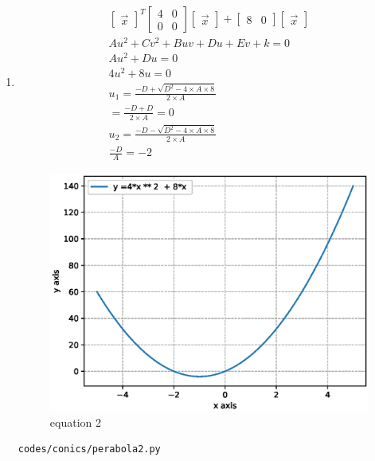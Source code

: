 \begin{enumerate}[label=\arabic*.,ref=\thesubsection.\theenumi]
\item
\begin{align}
\begin{bmatrix}\vec x\end{bmatrix}^T\begin{bmatrix}4 & 0\\0 & 0\end{bmatrix}\begin{bmatrix}\vec x\end{bmatrix} + \begin{bmatrix}8 & 0\end{bmatrix}\begin{bmatrix}\vec x\end{bmatrix} 
\\
Au^2+Cv^2+Buv+Du+Ev+k =0
\\
Au^2+Du = 0
\\
4u^2 + 8u = 0
\\
u_1 =  \frac{-D + \sqrt{D^2 - 4\times A\times 8 }}{2\times A}
\\
=  \frac{-D + D}{2\times A} = 0
\\
u_2 =  \frac{-D - \sqrt{D^2 - 4\times A\times 8 }}{2\times A}
\\
\frac{-D }{A} = -2
\end{align}
\begin{figure}[!ht]
	\centering
	\includegraphics[width=\columnwidth]{./figures/conics/perabola2.eps}
	\caption{equation 2 }
	\label{fig:perabola2}
\end{figure}
\begin{lstlisting}
codes/conics/perabola2.py
\end{lstlisting} 


\end{enumerate}
